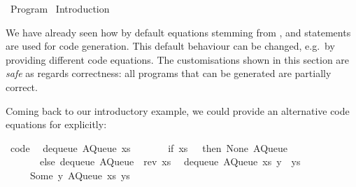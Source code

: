 %
\begin{isabellebody}%
\def\isabellecontext{Program}%
%
\isadelimtheory
%
\endisadelimtheory
%
\isatagtheory
{}\isamarkupfalse%
\ Program\isanewline
{}\ Introduction\isanewline
{}%
\endisatagtheory
{\isafoldtheory}%
%
\isadelimtheory
%
\endisadelimtheory
%
\isamarkuptrue%
%
\isamarkuptrue%
%
\begin{isamarkuptext}%
We have already seen how by default equations stemming from
  \hyperlink{command.definition}{\mbox{}}, \hyperlink{command.primrec}{\mbox{}} and \hyperlink{command.fun}{\mbox{}}
  statements are used for code generation.  This default behaviour
  can be changed, e.g.\ by providing different code equations.
  The customisations shown in this section are \emph{safe}
  as regards correctness: all programs that can be generated are partially
  correct.%
\end{isamarkuptext}%
\isamarkuptrue%
%
\isamarkuptrue%
%
\begin{isamarkuptext}%
Coming back to our introductory example, we
  could provide an alternative code equations for 
  explicitly:%
\end{isamarkuptext}%
\isamarkuptrue%
%
\isadelimquote
%
\endisadelimquote
%
\isatagquote
{}\isamarkupfalse%
\ {\isacharbrackleft}code{\isacharbrackright}{\isacharcolon}\isanewline
\ \ {\isachardoublequoteopen}dequeue\ {\isacharparenleft}AQueue\ xs\ {\isacharbrackleft}{\isacharbrackright}{\isacharparenright}\ {\isacharequal}\isanewline
\ \ \ \ \ {\isacharparenleft}if\ xs\ {\isacharequal}\ {\isacharbrackleft}{\isacharbrackright}\ then\ {\isacharparenleft}None{\isacharcomma}\ AQueue\ {\isacharbrackleft}{\isacharbrackright}\ {\isacharbrackleft}{\isacharbrackright}{\isacharparenright}\isanewline
\ \ \ \ \ \ \ else\ dequeue\ {\isacharparenleft}AQueue\ {\isacharbrackleft}{\isacharbrackright}\ {\isacharparenleft}rev\ xs{\isacharparenright}{\isacharparenright}{\isacharparenright}{\isachardoublequoteclose}\isanewline
\ \ {\isachardoublequoteopen}dequeue\ {\isacharparenleft}AQueue\ xs\ {\isacharparenleft}y\ {\isacharhash}\ ys{\isacharparenright}{\isacharparenright}\ {\isacharequal}\isanewline
\ \ \ \ \ {\isacharparenleft}Some\ y{\isacharcomma}\ AQueue\ xs\ ys{\isacharparenright}{\isachardoublequoteclose}\isanewline

\end{isabellebody}

